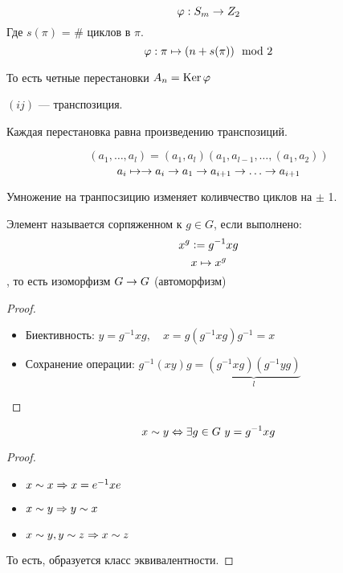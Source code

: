 \begin{example}
  \[\varphi: S_m \rightarrow Z_2\]
  Где $s(\pi)$ = \# циклов в $\pi$.
  \[\varphi: \pi \mapsto (n + s(\pi)) \mod 2\]

  То есть четные перестановки $A_n = \operatorname{Ker} \varphi$
\end{example}

\begin{reminder}
  $(ij)$ --- транспозиция.
\end{reminder}

\begin{lemma}
  Каждая перестановка равна произведению транспозиций.
\end{lemma}

\begin{example}
  \[(a_1, \dots, a_l) = (a_1, a_l) (a_1, a_{l-1}, \dots, (a_1, a_2))\]
  \[a_i \raone \ra a_i \ra a_1 \ra a_{i+1} \ra \dots \ra a_{i +1}\]
\end{example}

\begin{lemma}
  Умножение на транпосзицию изменяет коливчество циклов на $\pm$ 1.
\end{lemma}

\begin{proposition}
  Элемент называется сорпяженном к $g \in G$, если выполнено:
  \[x ^ g \vcentcolon= g ^{-1} x g\]
  \[x \mapsto x^g\], то есть изоморфизм $G \rightarrow G$ (автоморфизм)
  
\end{proposition}

\begin{proof}
  ~
  \begin{itemize}
    \item Биективность: $y = g ^ {-1} x g, \quad x = g(g ^ {-1} x g) g^{-1} = x$
    \item Сохранение операции: $g ^{-1} (xy) g = \underbrace{(g ^{-1} xg) (g^{-1} y g)}_{l}$
  \end{itemize}
\end{proof}

\begin{proposition}
  \[x \sim y \Leftrightarrow \exists g \in G \ y = g^{-1} x g\]
\end{proposition}

\begin{proof}
  ~
  \begin{itemize}
    \item $x \sim x \Rightarrow x = e ^{-1} x e$
    \item $x \sim y \Rightarrow y \sim x$
    \item $x \sim y, y \sim z \Rightarrow x \sim z$ 
  \end{itemize}
  То есть, образуется класс эквивалентности.
\end{proof}

